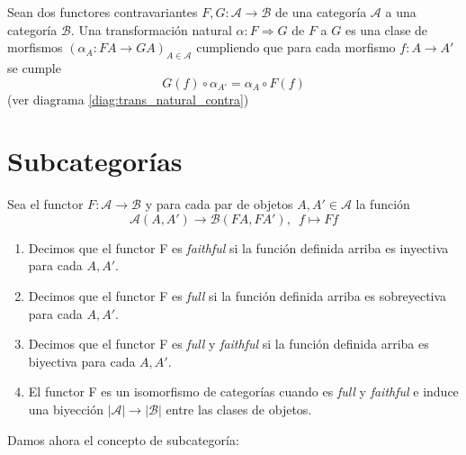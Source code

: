 \begin{definicion}
    Sean dos functores contravariantes $F,G: \mathscr{A} \longrightarrow \mathscr{B}$ de una categoría $\mathscr{A}$ a una categoría $\mathscr{B}$. Una transformación natural $\alpha: F \Rightarrow G$ de $F$ a $G$ es una clase de morfismos $(\alpha_A:FA \longrightarrow GA)_{A\in \mathscr{A}}$ cumpliendo que para cada morfismo $f: A \longrightarrow A'$ se cumple \begin{equation}
        G(f) \circ \alpha_{A'} = \alpha_{A} \circ F(f)
    \end{equation}
    (ver diagrama \ref{diag:trans_natural_contra})
    \label{t_natural}    
\end{definicion}

\section{Subcategorías}

\begin{definicion}
    Sea el functor $F: \mathscr{A} \longrightarrow \mathscr{B}$ y para cada par de objetos $A,A' \in \mathscr{A}$ la función \begin{equation}
        \mathscr{A}(A,A') \longrightarrow \mathscr{B}(FA,FA'), \, \, \, f \mapsto Ff
    \end{equation}
    \begin{enumerate}
        \item Decimos que el functor F es \textit{faithful} si la función definida arriba es inyectiva para cada $A,A'$.
        \item Decimos que el functor F es \textit{full} si la función definida arriba es sobreyectiva para cada $A,A'$.
        \item Decimos que el functor F es \textit{full} y \textit{faithful} si la función definida arriba es biyectiva para cada $A,A'$.
        \item El functor F es un isomorfismo de categorías cuando es \textit{full} y \textit{faithful} e induce una biyección $|\mathscr{A}| \longrightarrow |\mathscr{B}|$ entre las clases de objetos.
    \end{enumerate}
\end{definicion}

Damos ahora el concepto de subcategoría:

